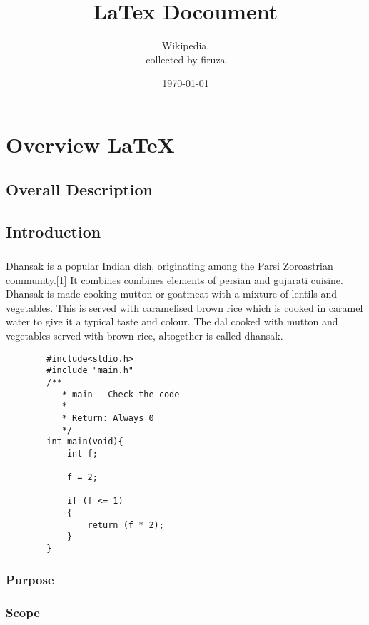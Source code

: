 \documentclass{book}
\title{LaTex Docoument}
\author{Wikipedia, \\collected by firuza }
\date{\today}
\begin{document}
	\maketitle
	\tableofcontents
	\chapter{Overview \LaTeX}
	
	\section{Overall Description}
	
	\section{Introduction}
	
	\paragraph{}
	Dhansak is a popular Indian dish, originating among the Parsi Zoroastrian community.[1] It combines combines elements of persian and gujarati cuisine. Dhansak is made cooking mutton or goatmeat with a mixture of lentils and vegetables. This is served with caramelised brown rice which is cooked in caramel water to give it a typical taste and colour. The dal cooked with mutton and vegetables served with brown rice, altogether is called dhansak.
	
	\begin{lstlisting}
		#include<stdio.h>
		#include "main.h"
		/**
		   * main - Check the code
		   * 
		   * Return: Always 0
		   */
		int main(void){
			int f;
			
			f = 2;
			
			if (f <= 1)
			{
				return (f * 2);
			}
		}
	\end{lstlisting}
	\subsection{Purpose}
	
	\subsection{Scope}
\end{document}
